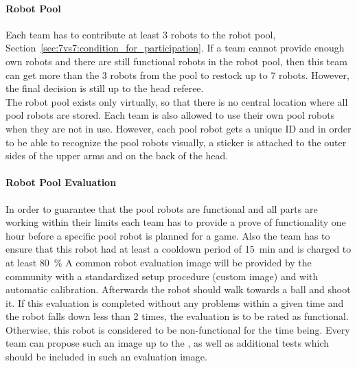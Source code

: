         \paragraph{Robot Pool}
            Each team has to contribute at least 3 robots to the robot pool, \cf Section~\ref{sec:7vs7:condition_for_participation}. If a team cannot provide enough own robots and there are still functional robots in the robot pool, then this team can get more than the 3 robots from the pool to restock up to 7 robots. However, the final decision is still up to the head referee. \\
            The robot pool exists only virtually, so that there is no central location where all pool robots are stored. Each team is also allowed to use their own pool robots when they are not in use. However, each pool robot gets a unique ID and in order to be able to recognize the pool robots visually, a sticker is attached to the outer sides of the upper arms and on the back of the head. 

        \paragraph{Robot Pool Evaluation}
            In order to guarantee that the pool robots are functional and all parts are working within their limits each team has to provide a prove of functionality one hour before a specific pool robot is planned for a game. Also the team has to ensure that this robot had at least a cooldown period of \qty{15}{\minute} and is charged to at least \qty{80}{\percent} 
            A common robot evaluation image will be provided by the community with a standardized setup procedure (custom image) and with automatic calibration. Afterwards the robot should walk towards a ball and shoot it. If this evaluation is completed without any problems within a given time  and the robot falls down less than 2 times, the evaluation is to be rated as functional. Otherwise, this robot is considered to be non-functional for the time being. Every team can propose such an image up to the , as well as additional tests which should be included in such an evaluation image.            

